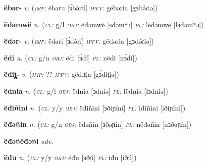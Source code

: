 \newentry
\headword\textbf{ëbər-}  
\ipa{[ɜbə́r-]}
\synpos\textit{v.} 
\imperative(\textit {\textsc{imp:}} ëbəru [ɜ́bə́rú] 
\imperfective\textit{\textsc{ipfv:}} gëbəria [gɜbə́ɾiə])

\newentry
\headword\textbf{ëdəmwë}  
\ipa{[ɜdəmʷɔ]}
\synpos\textit{n.} 
\class(\textit{\textsc{cl:}} {g/l}
\object\textit{\textsc{obj:}} ëdəmwë [ɜdəmʷɔ]
\plural\textit{\textsc{pl:}} lëdəmwë [lɜdəmʷɔ])

\newentry
\headword\textbf{ëdər-}  
\ipa{[ɜdə́r-]}
\synpos\textit{v.} 
\imperative(\textit {\textsc{imp:}} ëdəri [ɜ́də́rí] 
\imperfective\textit{\textsc{ipfv:}} gëdəria [gɜdə́ɾiə])

\newentry
\headword\textbf{ëdi}  
\ipa{[ɜ́dí]}
\synpos\textit{n.} 
\class(\textit{\textsc{cl:}} {g/n}
\object\textit{\textsc{obj:}} ëdi [ɜ́dí]
\plural\textit{\textsc{pl:}} nëdi [nɜ́dí])

\newentry
\headword\textbf{ëdit̪-}  
\ipa{[ɜ́dit̪-]}
\synpos\textit{v.} 
\imperative(\textit {\textsc{imp:}} ?? %
\imperfective\textit{\textsc{ipfv:}} gëdit̪ia [gɜ́dit̪iə])

\newentry
\headword\textbf{ëdnia}  
\ipa{[ɜdniə]}
\synpos\textit{n.} 
\class(\textit{\textsc{cl:}} {g/l}
\object\textit{\textsc{obj:}} ëdnia [ɜdniə]
\plural\textit{\textsc{pl:}} lëdnia [lɜdniə])

\newentry
\headword\textbf{ëđiñini}  
\ipa{[ɜðiɲíní]}
\synpos\textit{n.} 
\class(\textit{\textsc{cl:}} {y/y}
\object\textit{\textsc{obj:}} ëđiñini [ɜðiɲíní]
\plural\textit{\textsc{pl:}} iđiñini [iðiɲíní])

\newentry
\headword\textbf{ëđəñin}  
\ipa{[ɜðəɲín]}
\synpos\textit{n.} 
\class(\textit{\textsc{cl:}} {g/n}
\object\textit{\textsc{obj:}} ëđəñin [ɜðəɲín]
\plural\textit{\textsc{pl:}} nëđəñin [nɜðəɲín])



\newentry
\headword\textbf{ëđəñëđəñi}  
\ipa{[ɜ́ðə́ɲɜ́ðə́ɲí]}
\synpos\textit{adv.} 



\newentry
\headword\textbf{ëđu}  
\ipa{[ɜðú]}
\synpos\textit{n.} 
\class(\textit{\textsc{cl:}} {y/y}
\object\textit{\textsc{obj:}} ëđu [ɜðú]
\plural\textit{\textsc{pl:}} iđu [iðú])

